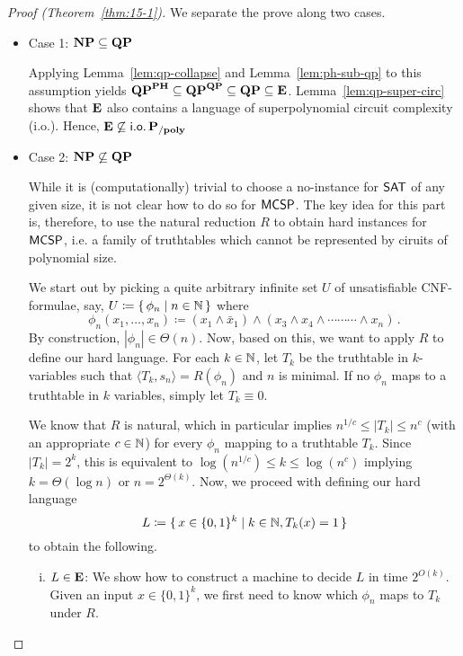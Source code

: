 \documentclass[11pt]{article}
\begin{document}
\begin{proof}[Proof (Theorem~\ref{thm:15-1})]
  We separate the prove along two cases.
	\begin{itemize}
		\item Case 1: $\mathbf{NP} \subseteq \mathbf{QP}$

      Applying Lemma~\ref{lem:qp-collapse} and Lemma~\ref{lem:ph-sub-qp} to
      this assumption yields
      $\mathbf{QP}^{\mathbf{PH}} \subseteq \mathbf{QP}^{\mathbf{QP}} \subseteq
       \mathbf{QP} \subseteq \mathbf{E}$.
      Lemma~\ref{lem:qp-super-circ} shows that $\mathbf{E}$ also contains
      a language of superpolynomial circuit complexity (i.o.).
      Hence, $\mathbf{E} \not\subseteq \mathsf{i.o.}\,\mathbf{P_{/poly}}$\\
		
		\item Case 2: $\mathbf{NP} \not\subseteq \mathbf{QP}$

      While it is (computationally) trivial to choose a no-instance for $\mathsf{SAT}$
      of any given size, it is not clear how to do so for $\mathsf{MCSP}$.
      The key idea for this part is, therefore, to use the natural reduction $R$
      to obtain hard instances for $\mathsf{MCSP}$, i.e. a family of
      truthtables which cannot be represented by ciruits of polynomial size.

      We start out by picking a quite arbitrary infinite set $U$ of 
      unsatisfiable CNF-formulae, say,
      $U \coloneqq \{\, { \phi_n \mid n \in {\mathbb{N}} } \,\}$
      where
      \[
        \phi_n(x_1, \dots, x_n) \coloneqq
        (x_1 \land \bar x_1) \land
        (x_3 \land x_4 \land \cdots \cdots \cdots \land x_n) \,.
      \]
      By construction, $|\phi_n| \in \Theta(n)$.
      Now, based on this, we want to apply $R$ to define our hard language.
      For each $k \in {\mathbb{N}}$, let $T_k$ be the truthtable in $k$-variables such
      that $\langle T_k, s_n \rangle = R(\phi_n)$ and $n$ is minimal.
      If no $\phi_n$ maps to a truthtable in $k$ variables, simply let
      $T_k \equiv 0$.

      We know that $R$ is natural, which in particular implies
      $n^{1/c} \le |T_k| \le n^c$ (with an appropriate $c \in {\mathbb{N}}$)
      for every $\phi_n$ mapping to a truthtable $T_k$.
      Since $|T_k| = 2^k$, this is equivalent to
      $\log (n^{1/c}) \le k \le \log (n^c)$
      implying $k = \Theta(\log n)$ or $n = 2^{\Theta(k)}$.
      Now, we proceed with defining our hard language
      \[
        L \coloneqq
        \{\, {
          x \in \{0,1\}^k \mid
          k \in {\mathbb{N}},
          T_k(x) = 1
        } \,\}
      \]
      to obtain the following.
      \begin{enumerate}[(i)]
        \item $L \in \mathbf{E}$:
          We show how to construct a machine to decide $L$ in time
          $2^{O(k)}$.
          Given an input $x \in \{0,1\}^k$, we first need to know which
          $\phi_n$ maps to $T_k$ under $R$.


\end{enumerate}
\end{itemize}
\end{proof}
\end{document}

